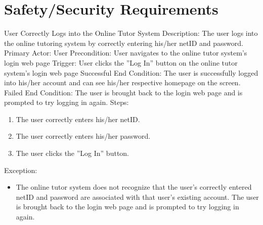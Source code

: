 
\chapter{Safety/Security Requirements}
    
    \begin{section}{User Correctly Logs into the Online Tutor System}
        Description: The user logs into the online tutoring system by correctly entering his/her netID and password. \newline
        Primary Actor: User \newline
        Precondition: User navigates to the online tutor system's login web page \newline
        Trigger: User clicks the ''Log In'' button on the online tutor system's login web page \newline
        Successful End Condition: The user is successfully logged into his/her account and can see his/her respective homepage on the screen. \newline
        Failed End Condition: The user is brought back to the login web page and is prompted to try logging in again. \newline
        \newline
        Steps:
        \begin{enumerate}
            \item{The user correctly enters his/her netID.}
            \item{The user correctly enters his/her password.}
            \item{The user clicks the ''Log In'' button.}
        \end{enumerate}
        Exception:
        \begin{itemize}
            \item{The online tutor system does not recognize that the user's correctly entered netID and password are associated with that user's existing account.
            The user is brought back to the login web page and is prompted to try logging in again.}
        \end{itemize}
    \end{section}
    
